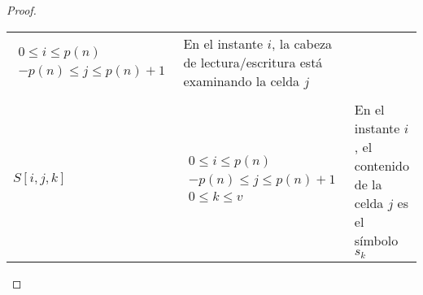 \documentclass[11pt, a4paper]{memoir}
\begin{document}
\begin{proof}
\begin{table}[!ht]
\begin{center}
{\begin{tabular}{@{}C{.15\textwidth}C{.25\textwidth}L{.45\textwidth}@{}}
  \begin{minipage}{.24\textwidth} %
  \centering
    \begin{math} %
      \begin{array}{c} %
          0 \le i\le p(n) \\ %
          -p(n) \le j \le p(n) + 1 %
        \end{array}%
    \end{math} %
  \end{minipage} & En el instante $i$, la cabeza de lectura/escritura está examinando la celda $j$\\ \\
$S[i,j,k]$       &

  \begin{minipage}{.24\textwidth} %
  \centering
    \begin{math} %
      \begin{array}{c} %
          0 \le i\le p(n) \\ %
           -p(n) \le j \le p(n) + 1 \\ %
           0 \le k \le v
        \end{array}%
    \end{math} %
  \end{minipage} & En el instante $i$, el contenido de la celda $j$ es el símbolo $s_k$\\
\bottomrule
      \end{tabular}
    }
  \end{center}
\end{table}
\end{proof}



\clearpage
\printglossary[type=\acronymtype]
\end{document}
